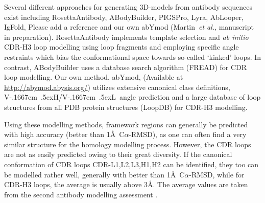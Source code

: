 \documentclass[12pt]{article}
\newcommand{\VH}{\mbox{V\kern-.1667em \lower.5ex\hbox{\scriptsize H}}}
\newcommand{\VL}{\mbox{V\kern-.1667em \lower.5ex\hbox{\scriptsize L}}}
\newcommand{\VHVL}{\mbox{\VH/\VL}}
\newcommand{\carmsd}{\mbox{C$\alpha$-RMSD}}
\newcommand{\etal}{~\emph{et al.}}
\newcommand{\lilian}[1]{ {\color{red}{\bfseries Lilian:} #1}}
\begin{document}
Several different approaches for generating 
3D-models from antibody sequences exist including
RosettaAntibody\cite{Sircar2009,Sivasubramanian2009}, 
ABodyBuilder\cite{Leem2016}, PIGSPro\cite{Lepore2017},
Lyra\cite{Klausen2015}, AbLooper\cite{Abanades2022},
IgFold\cite{XXXX}, \lilian{Please add a reference}
and our own abYmod (Martin\etal, manuscript in preparation).
RosettaAntibody implements template selection
and \emph{ab initio} CDR-H3 loop modelling using loop fragments and employing
specific angle restraints which bias the conformational space towards
so-called `kinked' loops\cite{Schoeder2021,Weitzner2017}. In
contrast, ABodyBuilder uses a database search algorithm
(FREAD\cite{Choi2010}) for CDR loop modelling. Our own method,
abYmod, (Available at \url{http://abymod.abysis.org/}) utilizes extensive canonical
class definitions\cite{Martin1996}, \VHVL\ angle prediction and a large database of loop
structures from all PDB protein structures (LoopDB) for CDR-H3 modelling.


Using these modelling methods, framework regions can
generally be predicted with high accuracy (better than 1\AA\
\carmsd\cite{Almagro2014}), as one can often find a very similar
structure for the homology modelling process.  However, the CDR loops
are not as easily predicted owing to their great diversity. If the
canonical conformation of CDR loops CDR-L1,L2,L3,H1,H2 can be identified, they too
can be modelled rather well, generally with better than 1\AA\ \carmsd, while for CDR-H3 loops,
the average is usually above 3\AA\cite{Almagro2011}. The average values are taken from the second antibody modelling assessment \cite{Almagro2014}.
\end{document}
